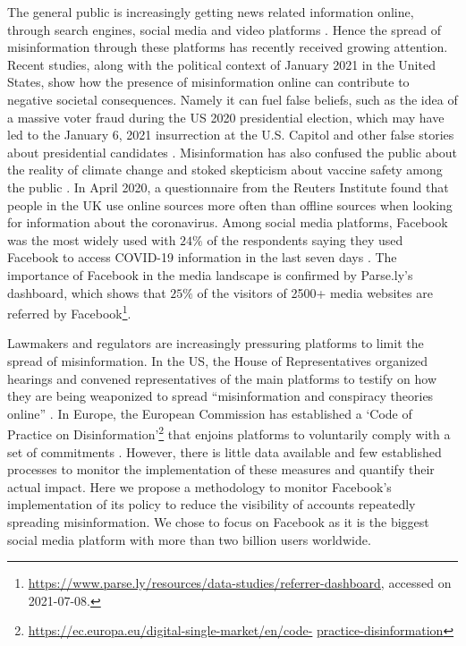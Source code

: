 \documentclass[11pt,a4paper]{article}
\begin{document}
The general public is increasingly getting news related information online, through search engines, social media and video platforms \citep{mitchell2016modern}.
Hence the spread of misinformation through these platforms has recently received growing attention.
Recent studies, along with the political context of January 2021 in the United States, show how the presence of misinformation online can contribute to negative societal consequences.
Namely it can fuel false beliefs, such as the idea of a massive voter fraud during the US 2020 presidential election, which may have led to the January 6, 2021 insurrection at the U.S. Capitol \citep{benkler2020mail} and other false stories about presidential candidates \citep{allcott2017social}. 
Misinformation has also confused the public about the reality of climate change \citep{brulle30years, porter2019can} and stoked skepticism about vaccine safety among the public \citep{featherstone2020feeling, lahouati2020spread}. 
In April 2020, a questionnaire from the Reuters Institute found that people in the UK use online sources more often than offline sources when looking for information about the coronavirus. 
Among social media platforms, Facebook was the most widely used with $24\%$ of the respondents saying they used Facebook to access COVID-19 information in the last seven days \citep{fletcher2020information}.
The importance of Facebook in the media landscape is confirmed by Parse.ly’s dashboard, which shows that $25\%$ of the visitors of 2500+ media websites are referred by Facebook\footnote{\href{https://www.parse.ly/resources/data-studies/referrer-dashboard}{https://www.parse.ly/resources/data-studies/referrer-dashboard}, accessed on 2021-07-08.}.

Lawmakers and regulators are increasingly pressuring platforms to limit the spread of misinformation. 
In the US, the House of Representatives organized hearings and convened representatives of the main platforms to testify on how they are being weaponized to spread ``misinformation and conspiracy theories online'' \citep{donovan2020}. 
In Europe, the European Commission has established a `Code of Practice on Disinformation'\footnote{\href{https://ec.europa.eu/digital-single-market/en/code-practice-disinformation}{https://ec.europa.eu/digital-single-market/en/code-} \href{https://ec.europa.eu/digital-single-market/en/code-practice-disinformation}{practice-disinformation}} that enjoins platforms to voluntarily comply with a set of commitments \citep{heldt2019let}. 
However, there is little data available and few established processes to monitor the implementation of these measures and quantify their actual impact. 
Here we propose a methodology to monitor Facebook’s implementation of its policy to reduce the visibility of accounts repeatedly spreading misinformation. 
We chose to focus on Facebook as it is the biggest social media platform with more than two billion users worldwide.
\end{document}
